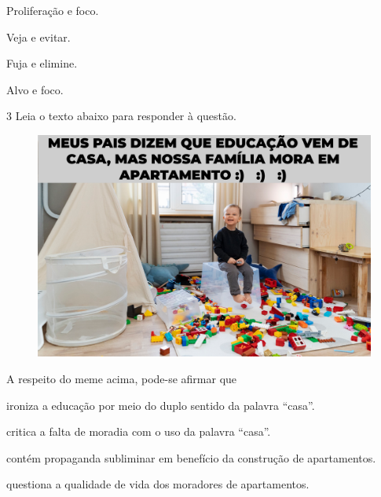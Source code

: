 \begin{escolha}
  
  \item Proliferação e foco.
  
  \item Veja e evitar.
  
  \item Fuja e elimine.
  
  \item Alvo e foco. 

\end{escolha}

\pagebreak
\num{3} Leia o texto abaixo para responder à questão.

\begin{figure}[htpb!]
\includegraphics[width=\textwidth]{./imgSAEB_7_POR/media/image7.png}
\end{figure}

A respeito do meme acima, pode-se afirmar que

\begin{escolha}
    
    \item ironiza a educação por meio do duplo sentido da palavra ``casa''.
    
    \item critica a falta de moradia com o uso da palavra ``casa''.
    
    \item contém propaganda subliminar em benefício da construção de apartamentos.
    
    \item questiona a qualidade de vida dos moradores de apartamentos.

\end{escolha}

